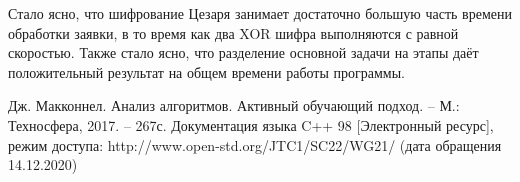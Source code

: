\documentclass[12pt,a4paper]{report}
\begin{document}
Стало ясно, что шифрование Цезаря занимает достаточно большую часть времени обработки заявки, в то время как 
два XOR шифра выполняются с равной скоростью. Также стало ясно, что разделение основной задачи на этапы даёт 
положительный результат на общем времени работы программы. 

\newpage
\renewcommand\bibname{Список литературы}
\makeatletter %
\def\@biblabel#1{#1. }
\makeatother
\begin{thebibliography}{2}
     Дж. Макконнел. Анализ алгоритмов. Активный обучающий подход. -- М.: Техносфера, 2017. -- 267с.
     Документация языка C++ 98 [Электронный ресурс], режим доступа: http://www.open-std.org/JTC1/SC22/WG21/ (дата обращения 14.12.2020)
\end{thebibliography}
\end{document}
